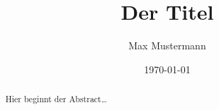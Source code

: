 \documentclass{article}
\title{Der Titel}
\author{Max Mustermann}
\date{\today}
\begin{document}
\maketitle

\begin{abstract}
Hier beginnt der Abstract\dots
\end{abstract}
\end{document}
